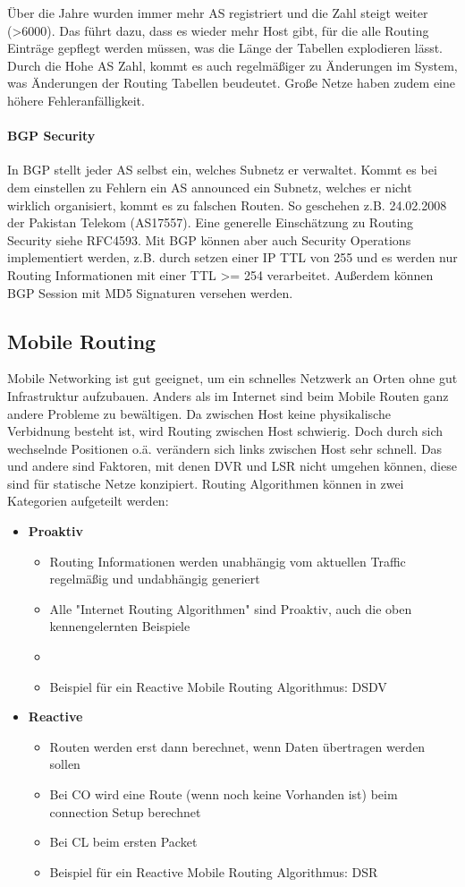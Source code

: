 				Über die Jahre wurden immer mehr AS registriert und die Zahl steigt weiter (>6000). Das führt dazu, dass es wieder mehr Host gibt, für die alle Routing Einträge gepflegt werden müssen, was die Länge der Tabellen explodieren lässt. Durch die Hohe AS Zahl, kommt es auch regelmäßiger zu Änderungen im System, was Änderungen der Routing Tabellen beudeutet. Große Netze haben zudem eine höhere Fehleranfälligkeit. 

				\paragraph{BGP Security}
					In BGP stellt jeder AS selbst ein, welches Subnetz er verwaltet. Kommt es bei dem einstellen zu Fehlern ein AS announced ein Subnetz, welches er nicht wirklich organisiert, kommt es zu falschen Routen. So geschehen z.B. 24.02.2008 der Pakistan Telekom (AS17557). Eine generelle Einschätzung zu Routing Security siehe RFC4593. Mit BGP können aber auch Security Operations implementiert werden, z.B. durch setzen einer IP TTL von 255 und es werden nur Routing Informationen mit einer TTL >= 254 verarbeitet. Außerdem können BGP Session mit MD5 Signaturen versehen werden.
	\subsection{Mobile Routing}
		Mobile Networking ist gut geeignet, um ein schnelles Netzwerk an Orten ohne gut Infrastruktur aufzubauen. Anders als im Internet sind beim Mobile Routen ganz andere Probleme zu bewältigen. Da zwischen Host keine physikalische Verbidnung besteht ist, wird Routing zwischen Host schwierig. Doch durch sich wechselnde Positionen o.ä. verändern sich links zwischen Host sehr schnell. Das und andere sind Faktoren, mit denen DVR und LSR nicht umgehen können, diese sind für statische Netze konzipiert. Routing Algorithmen können in zwei Kategorien aufgeteilt werden:
		\begin{itemize}
			\item \textbf{Proaktiv}
				\begin{itemize}
					\item Routing Informationen werden unabhängig vom aktuellen Traffic regelmäßig und undabhängig generiert
					\item Alle "Internet Routing Algorithmen" sind Proaktiv, auch die oben kennengelernten Beispiele
					\item \item Beispiel für ein Reactive Mobile Routing Algorithmus: DSDV
				\end{itemize}
			\item \textbf{Reactive}
				\begin{itemize}
					\item Routen werden erst dann berechnet, wenn Daten übertragen werden sollen
					\item Bei CO wird eine Route (wenn noch keine Vorhanden ist) beim connection Setup berechnet
					\item Bei CL beim ersten Packet
					\item Beispiel für ein Reactive Mobile Routing Algorithmus: DSR
				\end{itemize}
		\end{itemize}

